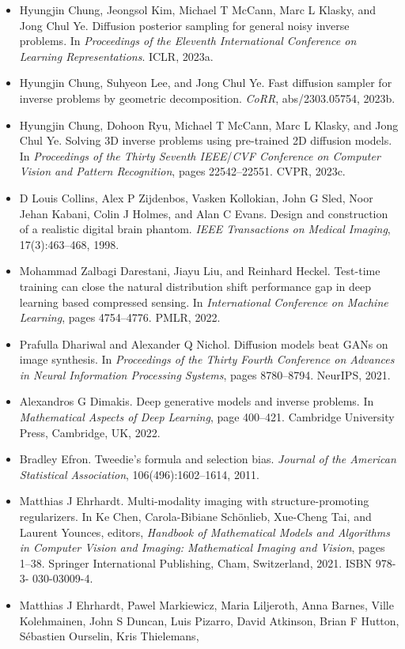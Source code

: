 \documentclass{article}
\begin{document}
\begin{itemize}
\item 
Hyungjin Chung, Jeongsol Kim, Michael T McCann, Marc L Klasky, and Jong Chul Ye. Diffusion posterior sampling for general noisy inverse problems. In \textit{Proceedings of the Eleventh International Conference on Learning Representations}. ICLR, 2023a.

\item 
Hyungjin Chung, Suhyeon Lee, and Jong Chul Ye. Fast diffusion sampler for inverse problems by geometric decomposition. \textit{CoRR}, abs/2303.05754, 2023b.

\item 
Hyungjin Chung, Dohoon Ryu, Michael T McCann, Marc L Klasky, and Jong Chul Ye. Solving 3D inverse problems using pre-trained 2D diffusion models. In \textit{Proceedings of the Thirty Seventh IEEE}/\textit{CVF Conference on Computer Vision and Pattern Recognition}, pages 22542–22551. CVPR, 2023c.

\item 
D Louis Collins, Alex P Zijdenbos, Vasken Kollokian, John G Sled, Noor Jehan Kabani, Colin J Holmes, and Alan C Evans. Design and construction of a realistic digital brain phantom. \textit{IEEE Transactions on Medical Imaging}, 17(3):463–468, 1998.

\item 
Mohammad Zalbagi Darestani, Jiayu Liu, and Reinhard Heckel. Test-time training can close the natural distribution shift performance gap in deep learning based compressed sensing. In \textit{International Conference on Machine Learning}, pages 4754–4776. PMLR, 2022.

\item 
Prafulla Dhariwal and Alexander Q Nichol. Diffusion models beat GANs on image synthesis. In \textit{Proceedings of the Thirty Fourth Conference on Advances in Neural Information Processing Systems}, pages 8780–8794. NeurIPS, 2021.

\item 
Alexandros G Dimakis. Deep generative models and inverse problems. In \textit{Mathematical Aspects of Deep Learning}, page 400–421. Cambridge University Press, Cambridge, UK, 2022.

\item 
Bradley Efron. Tweedie's formula and selection bias. \textit{Journal of the American Statistical Association}, 106(496):1602–1614, 2011.

\item 
Matthias J Ehrhardt. Multi-modality imaging with structure-promoting regularizers. In Ke Chen, Carola-Bibiane Schönlieb, Xue-Cheng Tai, and Laurent Younces, editors, \textit{Handbook of Mathematical Models and Algorithms in Computer Vision and Imaging: Mathematical Imaging and Vision}, pages 1–38. Springer International Publishing, Cham, Switzerland, 2021. ISBN 978-3- 030-03009-4.

\item 
Matthias J Ehrhardt, Pawel Markiewicz, Maria Liljeroth, Anna Barnes, Ville Kolehmainen, John S Duncan, Luis Pizarro, David Atkinson, Brian F Hutton, Sébastien Ourselin, Kris Thielemans,

\end{itemize}
\end{document}
